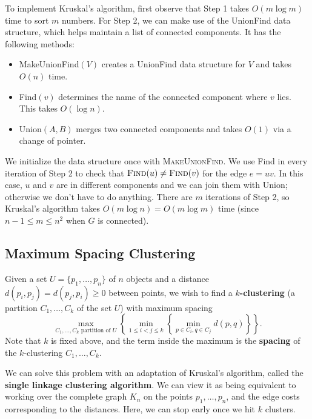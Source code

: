 To implement Kruskal's algorithm, first observe that Step 1 takes 
$O(m\log m)$ time to sort $m$ numbers. For Step 2, we can make use 
of the {\sc UnionFind} data structure, which helps maintain a 
list of connected components. It has the following methods:
\begin{itemize}
    \item {\sc MakeUnionFind}$(V)$ creates a {\sc UnionFind} data structure 
    for $V$ and takes $O(n)$ time. 
    \item {\sc Find}$(v)$ determines the name of the connected component where 
    $v$ lies. This takes $O(\log n)$. 
    \item {\sc Union}$(A, B)$ merges two connected components and takes 
    $O(1)$ via a change of pointer. 
\end{itemize}
We initialize the data structure once with \textsc{MakeUnionFind}.
We use {\sc Find} in every iteration of Step 2 to check that 
$\textsc{Find}(u) \neq \textsc{Find}(v)$ for the edge $e = uv$. In this 
case, $u$ and $v$ are in different components and we can join them with 
{\sc Union}; otherwise we don't have to do anything. There are $m$ iterations 
of Step 2, so Kruskal's algorithm takes $O(m\log n) = O(m\log m)$ 
time (since $n-1 \leq m \leq n^2$ when $G$ is connected).

\subsection{Maximum Spacing Clustering}\label{subsec:2.5}
Given a set $U = \{p_1, \dots, p_n\}$ of $n$ objects and a distance 
$d(p_i, p_j) = d(p_j, p_i) \geq 0$ between points, we wish to find a 
{\bf $k$-clustering} (a partition $C_1, \dots, C_k$ of the set $U$) with 
maximum spacing 
\[ \max_{C_1, \dots, C_k \text{ partition of } U} 
\left\{ \min_{1\leq i<j\leq k} \left\{ \min_{p\in C_i, q \in C_j} 
d(p, q) \right\} \right\}. \] 
Note that $k$ is fixed above, and the term inside the maximum is the 
{\bf spacing} of the $k$-clustering $C_1, \dots, C_k$.

We can solve this problem with an adaptation of Kruskal's algorithm, 
called the {\bf single linkage clustering algorithm}.
We can view it as being equivalent to working over the complete 
graph $K_n$ on the points $p_1, \dots, p_n$,
and the edge costs corresponding to the distances. Here,
we can stop early once we hit $k$ clusters.

